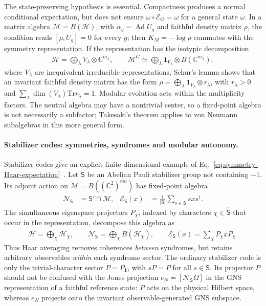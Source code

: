 \documentclass[a4paper,11pt]{article}
\theoremstyle{definition}
\newcommand{\cH}{\mathcal{H}}
\newcommand{\Tr}{\text{Tr}}
\newcommand{\mN}{\mathcal{N}}
\newcommand{\mM}{\mathcal{M}}
\newcommand{\mE}{\mathcal{E}}
\begin{document}
The state-preserving hypothesis is essential. Compactness produces a
normal conditional expectation, but does not ensure
$\omega\circ\mE_G=\omega$ for a general state $\omega$. In a matrix
algebra $\mM=B(\cH)$, with $\alpha_g=\operatorname{Ad}U_g$ and faithful
density matrix $\rho$, the condition reads $[\rho,U_g]=0$ for every $g$;
then $K_M=-\log\rho$ commutes with the symmetry representation. If the
representation has the isotypic decomposition
\begin{align}
 \cH=\bigoplus_{\lambda} V_\lambda\otimes\mathbb C^{m_\lambda},
 \qquad
 \mM^G\simeq\bigoplus_{\lambda}
       \mathbf 1_{V_\lambda}\otimes B(\mathbb C^{m_\lambda}),
 \label{eq:symmetry-isotypic}
\end{align}
where $V_\lambda$ are inequivalent irreducible representations, Schur's
lemma shows that an invariant faithful density matrix has the form
$\rho=\bigoplus_\lambda\mathbf1_{V_\lambda}\otimes r_\lambda$,
with $r_\lambda>0$ and $\sum_\lambda\dim(V_\lambda)\Tr r_\lambda=1$.
Modular evolution acts within the multiplicity factors. The neutral
algebra may have a nontrivial center, so a fixed-point algebra is not
necessarily a subfactor; Takesaki's theorem applies to von Neumann
subalgebras in this more general form.

\paragraph{Stabilizer codes: symmetries, syndromes and modular autonomy.}
Stabilizer codes give an explicit finite-dimensional example of
Eq.~\eqref{eq:symmetry-Haar-expectation}~\cite{Gottesman1997,KnillLaflamme1997}.
Let $\mathsf S$ be an Abelian Pauli stabilizer group not containing $-1$.
Its adjoint action on $\mM=B((\mathbb C^2)^{\otimes n})$ has fixed-point
algebra
\begin{align}
 \mN_{\mathsf S}&=\mathsf S'\cap\mM,
 &\mE_{\mathsf S}(x)&=\frac{1}{|\mathsf S|}
                    \sum_{s\in\mathsf S}sxs^\dagger .
 \label{eq:stabilizer-conditional-expectation}
\end{align}
The simultaneous eigenspace projectors $P_\chi$, indexed by characters
$\chi\in\widehat{\mathsf S}$ that occur in the representation, decompose
this algebra as
\begin{align}
 \cH=\bigoplus_{\chi}\cH_\chi,
 \qquad
 \mN_{\mathsf S}=\bigoplus_{\chi}B(\cH_\chi),
 \qquad
 \mE_{\mathsf S}(x)=\sum_\chi P_\chi xP_\chi .
 \label{eq:stabilizer-syndrome-decomposition}
\end{align}
Thus Haar averaging removes coherences \emph{between} syndromes, but
retains arbitrary observables \emph{within} each syndrome sector. The
ordinary stabilizer code is only the trivial-character sector
$P=P_{\mathbf1}$, with $sP=P$ for all $s\in\mathsf S$. Its projector $P$
should not be confused with the Jones projection
$e_N=[\mN_{\mathsf S}\Omega]$ in the GNS representation of a faithful
reference state: $P$ acts on the physical Hilbert space, whereas $e_N$
projects onto the invariant observable-generated GNS subspace.
\end{document}

